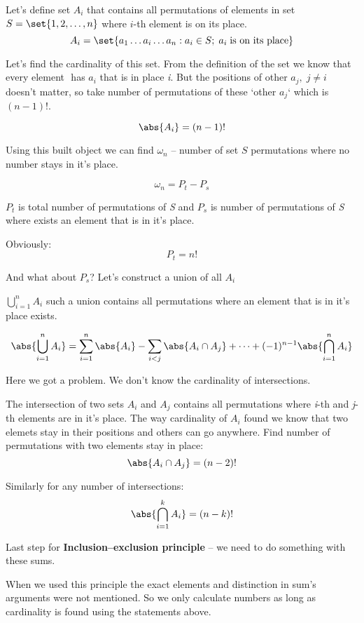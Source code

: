 \exercise[1.13]
Let's define set \( A_i \) that contains all permutations of elements in set \( S = \set{ 1, 2, \dots{}, n } \) where \( i \)-th element is on its place.
\[ A_i = \set{ a_1 \dots{} a_i \dots{} a_n : a_i \in S ; \; a_i \; \text{is on its place} } \]

Let's find the cardinality of this set.
From the definition of the set we know that every element \( \)  has \( a_i \) that is in place
\textit{i}. But the positions of other \( a_j ,\; j \neq i \) doesn't matter, so take number of
permutations of these `other \(a_j\)` which is \( (n-1)! \).

\[ \abs{A_i} = (n-1)! \]

Using this built object we can find \( \omega_n \) -- number of set \( S \)
permutations where no number stays in it's place.

\[ \omega_n = P_t - P_s \]

\( P_t \) is total number of permutations of \textit{S} and \( P_s \) is number of permutations of
\textit{S} where exists an element that is in it's place.

Obviously:
\[ P_t = n! \]

And what about \( P_s \)? Let's construct a union of all \(A_i\)

\( \bigcup_{i=1}^{n} A_i \) such a union contains all permutations where an element that is in it's
place exists.

\[ \abs{\bigcup_{i=1}^{n} A_i } = \sum_{i=1}^{n}{\abs{A_i}} - \sum_{i<j}{\abs{A_i \cap A_j}} + \dots
+ (-1)^{n-1}\abs{\bigcap_{i=1}^{n}{A_i}}\]

Here we got a problem. We don't know the cardinality of intersections.

The intersection of two sets \(A_i\) and \(A_j\) contains all permutations where \textit{i}-th and
\textit{j}-th elements are in it's place. The way cardinality of \(A_i\) found we know that two
elemets stay in their positions and others can go anywhere. Find number of permutations with two
elements stay in place:
\[ \abs{A_i \cap A_j} = (n-2)! \]

Similarly for any number of intersections:
\[ \abs{\bigcap_{i=1}^{k}{A_i}} = (n-k)! \]

Last step for \textbf{Inclusion–exclusion principle} -- we need to do something with these sums.

When we used this principle the exact elements and distinction in sum's arguments were not
mentioned. So we only calculate numbers as long as cardinality is found using the statements
above.

